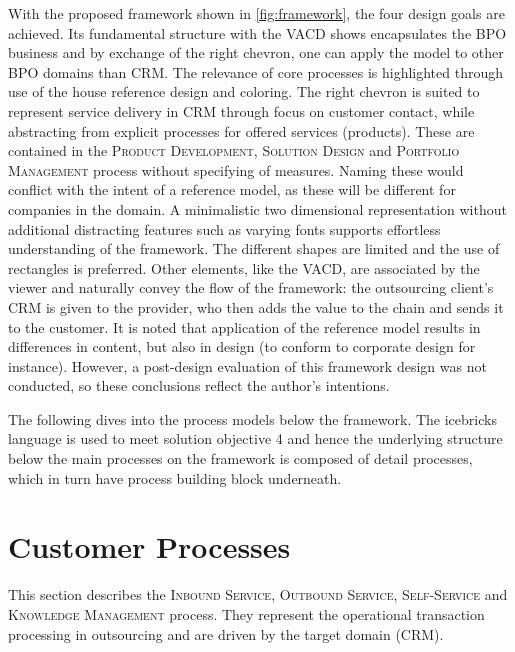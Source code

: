 	 
	 With the proposed framework shown in \Fig \ref{fig:framework}, the four design goals are achieved. Its fundamental structure with the \acrshort{VACD} shows encapsulates the BPO business and by exchange of the right chevron, one can apply the model to other BPO domains than \acrshort{CRM}. The relevance of core processes is highlighted through use of the house reference design and coloring. The right chevron is suited to represent service delivery in \acrshort{CRM} through focus on customer contact, while abstracting from explicit processes for offered services (products). These are contained in the \textsc{Product Development}, \textsc{Solution Design} and \textsc{Portfolio Management} process without specifying of measures. Naming these would conflict with the intent of a reference model, as these will be different for companies in the domain. A minimalistic two dimensional representation without additional distracting features such as  varying fonts supports effortless understanding of the framework. The different shapes are limited and the use of rectangles is preferred. Other elements, like the \acrshort{VACD}, are associated by the viewer and naturally convey the flow of the framework: the outsourcing client's \acrshort{CRM} is given to the provider, who then adds the value to the chain and sends it to the customer. It is noted that application of the reference model results in differences in content, but also in design (to conform to corporate design for instance). However, a post-design evaluation of this framework design was not conducted, so these conclusions reflect the author's intentions.
	 
	 The following dives into the process models below the framework. The icebricks language is used to meet solution objective 4 and hence the underlying structure below the main processes on the framework is composed of detail processes, which in turn have process building block underneath. 
	 
	 
	 \section{Customer Processes}

	 
	 This section describes the \textsc{Inbound Service}, \textsc{Outbound Service}, \textsc{Self-Service} and \textsc{Knowledge Management} process. They represent the operational transaction processing in outsourcing and are driven by the target domain (\acrshort{CRM}). 
	 
